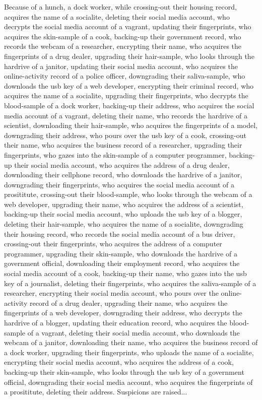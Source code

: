 \documentclass{report}
\begin{document}
Because of a hunch, a dock worker, while crossing-out their housing record, acquires the name of a socialite, deleting their social media account, who decrypts the social media account of a vagrant, updating their fingerprints, who acquires the skin-sample of a cook, backing-up their government record, who records the webcam of a researcher, encrypting their name, who acquires the fingerprints of a drug dealer, upgrading their hair-sample, who looks through the hardrive of a janitor, updating their social media account, who acquires the online-activity record of a police officer, downgrading their saliva-sample, who downloads the usb key of a web developer, encrypting their criminal record, who acquires the name of a socialite, upgrading their fingerprints, who decrypts the blood-sample of a dock worker, backing-up their address, who acquires the social media account of a vagrant, deleting their name, who records the hardrive of a scientist, downloading their hair-sample, who acquires the fingerprints of a model, downgrading their address, who pours over the usb key of a cook, crossing-out their name, who acquires the business record of a researcher, upgrading their fingerprints, who gazes into the skin-sample of a computer programmer, backing-up their social media account, who acquires the address of a drug dealer, downloading their cellphone record, who downloads the hardrive of a janitor, downgrading their fingerprints, who acquires the social media account of a prosititute, crossing-out their blood-sample, who looks through the webcam of a web developer, upgrading their name, who acquires the address of a scientist, backing-up their social media account, who uploads the usb key of a blogger, deleting their hair-sample, who acquires the name of a socialite, downgrading their housing record, who records the social media account of a bus driver, crossing-out their fingerprints, who acquires the address of a computer programmer, upgrading their skin-sample, who downloads the hardrive of a government official, downloading their employment record, who acquires the social media account of a cook, backing-up their name, who gazes into the usb key of a journalist, deleting their fingerprints, who acquires the saliva-sample of a researcher, encrypting their social media account, who pours over the online-activity record of a drug dealer, upgrading their name, who acquires the fingerprints of a web developer, downgrading their address, who decrypts the hardrive of a blogger, updating their education record, who acquires the blood-sample of a vagrant, deleting their social media account, who downloads the webcam of a janitor, downloading their name, who acquires the business record of a dock worker, upgrading their fingerprints, who uploads the name of a socialite, encrypting their social media account, who acquires the address of a cook, backing-up their skin-sample, who looks through the usb key of a government official, downgrading their social media account, who acquires the fingerprints of a prosititute, deleting their address. Suspicions are raised...
\end{document}
